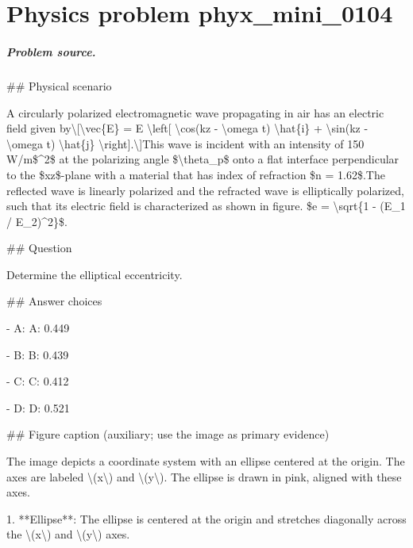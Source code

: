 
\chapter{Physics problem phyx\_mini\_0104}
\label{ch:PhyXMiniProblems_problem_phyx_mini_0104}

\paragraph{Problem source.}
\#\# Physical scenario

A circularly polarized electromagnetic wave propagating in air has an electric field given by\textbackslash{}[\textbackslash{}vec\{E\} = E \textbackslash{}left[ \textbackslash{}cos(kz - \textbackslash{}omega t) \textbackslash{}hat\{i\} + \textbackslash{}sin(kz - \textbackslash{}omega t) \textbackslash{}hat\{j\} \textbackslash{}right].\textbackslash{}]This wave is incident with an intensity of 150 W/m\$\textasciicircum{}2\$ at the polarizing angle \$\textbackslash{}theta\_p\$ onto a flat interface perpendicular to the \$xz\$-plane with a material that has index of refraction \$n = 1.62\$.The reflected wave is linearly polarized and the refracted wave is elliptically polarized, such that its electric field is characterized as shown in figure. \$e = \textbackslash{}sqrt\{1 - (E\_1 / E\_2)\textasciicircum{}2\}\$.

\#\# Question

Determine the elliptical eccentricity.

\#\# Answer choices

- A: A: 0.449

- B: B: 0.439

- C: C: 0.412

- D: D: 0.521

\#\# Figure caption (auxiliary; use the image as primary evidence)

The image depicts a coordinate system with an ellipse centered at the origin. The axes are labeled \textbackslash{}(x\textbackslash{}) and \textbackslash{}(y\textbackslash{}). The ellipse is drawn in pink, aligned with these axes.

1. **Ellipse**: The ellipse is centered at the origin and stretches diagonally across the \textbackslash{}(x\textbackslash{}) and \textbackslash{}(y\textbackslash{}) axes. 

